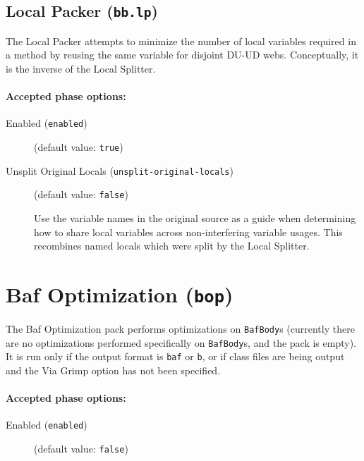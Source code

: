 \documentclass{article}
\begin{document}
\subsection{Local Packer ({\tt bb.lp})}

The Local Packer attempts to minimize the number of local
variables required in a method by reusing the same variable for
disjoint DU-UD webs. Conceptually, it is the inverse of the
Local Splitter.


\paragraph{Accepted phase options:} 

\begin{description}

\item[Enabled ({\tt enabled})]
(default value: {\tt true})






\item[Unsplit Original Locals ({\tt unsplit-original-locals})]
(default value: {\tt false})




Use the variable names in the original source as a guide when
determining how to share local variables across non-interfering
variable usages. This recombines named locals which were split by
the Local Splitter. 



\end{description}

\section{Baf Optimization ({\tt bop})}

The Baf Optimization pack performs optimizations on
{\tt BafBody}s (currently there are no optimizations performed
specifically on {\tt BafBody}s, and the pack is empty). It is
run only if the output format is {\tt baf} or {\tt b}, or
if class files are being output and the Via Grimp option
has not been specified.


\paragraph{Accepted phase options:} 

\begin{description}

\item[Enabled ({\tt enabled})]
(default value: {\tt false})






\end{description}
\end{document}
